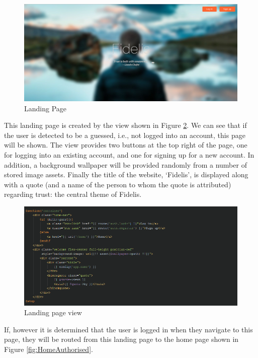 \begin{figure}[H]
\centering
\includegraphics[width=\textwidth]{Images/Implementation/home_unauthorised}
\caption{Landing Page}
\label{fig:HomeUnauthorised}
\end{figure}

This landing page is created by the view shown in Figure \ref{fig:LandingView}. We can see that if the user is detected to be a guessed, i.e., not logged into an account, this page will be shown. The view provides two buttons at the top right of the page, one for logging into an existing account, and one for signing up for a new account. In addition, a background wallpaper will be provided randomly from a number of stored image assets. Finally the title of the website, `Fidelis', is displayed along with a quote (and a name of the person to whom the quote is attributed) regarding trust: the central theme of Fidelis.

\begin{figure}[H]
\centering
\includegraphics[width=\textwidth]{Images/Implementation/LandingView}
\caption{Landing page view}
\label{fig:LandingView}
\end{figure}

If, however it is determined that the user is logged in when they navigate to this page, they will be routed from this landing page to the home page shown in Figure \ref{fig:HomeAuthorised}.

